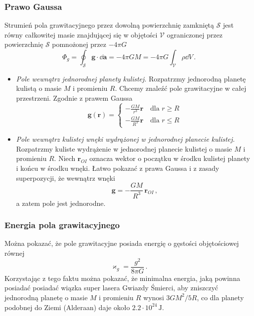 \documentclass[../main.tex]{subfiles}
\begin{document}
\subsubsection*{Prawo Gaussa}
Strumień pola grawitacyjnego przez dowolną powierzchnię zamkniętą \(\mathcal{S}\) jest równy
całkowitej masie znajdującej się w objętości \(\mathcal{V}\) ograniczonej przez powierzchnię
\(\mathcal{S}\) pomnożonej przez \(-4\pi G\)
\begin{equation*}
    \Phi_{g}=\oint_{\mathcal{S}}\mathbf{g}\cdot \dd\mathbf{a}=-4\pi GM=-4\pi G\int_{\mathcal{V}}\rho \dd{V}\,.
\end{equation*}
\begin{itemize}
    \item \textit{Pole wewnątrz jednorodnej planety kulistej.} Rozpatrzmy jednorodną planetę kulistą
    o masie \(M\) i promieniu \(R\). Chcemy znaleźć pole grawitacyjne w całej przestrzeni. Zgodnie z
    prawem Gaussa
\begin{equation*}
    \mathbf{g}(\mathbf{r})=\begin{cases}-\frac{GM}{r^3}\mathbf{r}\quad\text{dla \(r\geq R\)}\\
    -\frac{GM}{R^3}\mathbf{r}\quad\text{dla \(r\leq R\)}
    \end{cases}
\end{equation*}

\item \textit{Pole wewnątrz kulistej wnęki wydrążonej w jednorodnej planecie kulistej.} Rozpatrzmy
kuliste wydrążenie w jednorodnej planecie kulistej o masie \(M\) i promieniu \(R\). Niech
\(\mathbf{r}_{OI}\) oznacza wektor o początku w środku kulistej planety i końcu w środku wnęki.
Łatwo pokazać z prawa Gaussa i z zasady superpozycji, że wewnątrz wnęki
\begin{equation*}
    \mathbf{g}=-\frac{GM}{R^3}\,\mathbf{r}_{OI}\,,
\end{equation*}
a zatem pole jest jednorodne.
\end{itemize}

\subsubsection{Energia pola grawitacyjnego}
Można pokazać, że pole grawitacyjne posiada energię o gęstości objętościowej równej
\begin{equation*}
    \varkappa_{g}=\frac{g^2}{8\pi G}\,.
\end{equation*}
Korzystając z tego faktu można pokazać, że minimalna energia, jaką powinna posiadać posiadać wiązka
super lasera Gwiazdy Śmierci, aby zniszczyć jednorodną planetę o masie \(M\) i promieniu \(R\)
wynosi \(3GM^2/5R\), co dla planety podobnej do Ziemi (Alderaan) daje około
\(2.2\cdot10^{24}\,\text{J}\).
\end{document}
